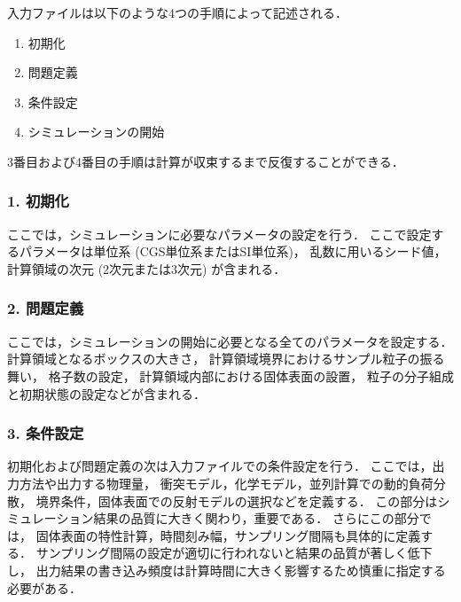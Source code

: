 入力ファイルは以下のような4つの手順によって記述される．
\begin{enumerate}
    \item 初期化
    \item 問題定義
    \item 条件設定
    \item シミュレーションの開始
\end{enumerate}
3番目および4番目の手順は計算が収束するまで反復することができる．

\subsubsection{1. 初期化}
ここでは，シミュレーションに必要なパラメータの設定を行う．
ここで設定するパラメータは単位系 (CGS単位系またはSI単位系)，
乱数に用いるシード値，
計算領域の次元 (2次元または3次元) が含まれる．

\subsubsection{2. 問題定義}
ここでは，シミュレーションの開始に必要となる全てのパラメータを設定する．
計算領域となるボックスの大きさ，
計算領域境界におけるサンプル粒子の振る舞い，
格子数の設定，
計算領域内部における固体表面の設置，
粒子の分子組成と初期状態の設定などが含まれる．

\subsubsection{3. 条件設定}
初期化および問題定義の次は入力ファイルでの条件設定を行う．
ここでは，出力方法や出力する物理量，
衝突モデル，化学モデル，並列計算での動的負荷分散，
境界条件，固体表面での反射モデルの選択などを定義する．
この部分はシミュレーション結果の品質に大きく関わり，重要である．
さらにこの部分では，
固体表面の特性計算，時間刻み幅，サンプリング間隔も具体的に定義する．
サンプリング間隔の設定が適切に行われないと結果の品質が著しく低下し，
出力結果の書き込み頻度は計算時間に大きく影響するため慎重に指定する必要がある．
